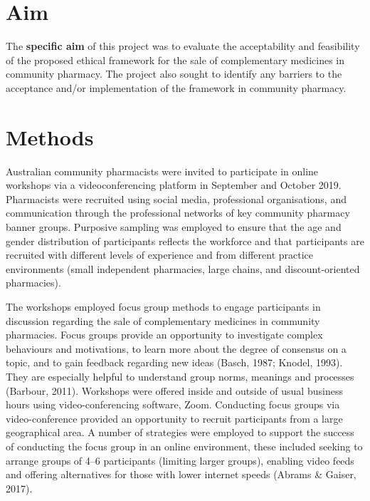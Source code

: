 \documentclass[12pt,]{article}
\begin{document}
\section{Aim}\label{aim}

The \textbf{specific aim} of this project was to evaluate the
acceptability and feasibility of the proposed ethical framework for the
sale of complementary medicines in community pharmacy. The project also
sought to identify any barriers to the acceptance and/or implementation
of the framework in community pharmacy.

\section{Methods}\label{methods}

Australian community pharmacists were invited to participate in online
workshops via a videoconferencing platform in September and October
2019. Pharmacists were recruited using social media, professional
organisations, and communication through the professional networks of
key community pharmacy banner groups. Purposive sampling was employed to
ensure that the age and gender distribution of participants reflects the
workforce and that participants are recruited with different levels of
experience and from different practice environments (small independent
pharmacies, large chains, and discount-oriented pharmacies).

The workshops employed focus group methods to engage participants in
discussion regarding the sale of complementary medicines in community
pharmacies. Focus groups provide an opportunity to investigate complex
behaviours and motivations, to learn more about the degree of consensus
on a topic, and to gain feedback regarding new ideas (Basch, 1987;
Knodel, 1993). They are especially helpful to understand group norms,
meanings and processes (Barbour, 2011). Workshops were offered inside
and outside of usual business hours using video-conferencing software,
Zoom. Conducting focus groups via video-conference provided an
opportunity to recruit participants from a large geographical area. A
number of strategies were employed to support the success of conducting
the focus group in an online environment, these included seeking to
arrange groups of 4--6 participants (limiting larger groups), enabling
video feeds and offering alternatives for those with lower internet
speeds (Abrams \& Gaiser, 2017).
\end{document}
